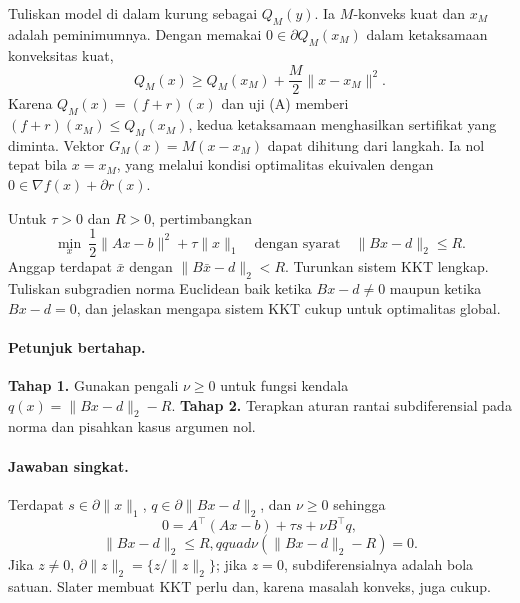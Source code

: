 Tuliskan model di dalam kurung sebagai $Q_M(y)$. Ia $M$-konveks kuat dan
$x_M$ adalah peminimumnya. Dengan memakai $0\in\partial Q_M(x_M)$ dalam
ketaksamaan konveksitas kuat,
\[
 Q_M(x)\ge Q_M(x_M)+\frac M2\lVert x-x_M\rVert^2.
\]
Karena $Q_M(x)=(f+r)(x)$ dan uji (A) memberi
$(f+r)(x_M)\le Q_M(x_M)$, kedua ketaksamaan menghasilkan sertifikat yang
diminta. Vektor $G_M(x)=M(x-x_M)$ dapat dihitung dari langkah. Ia nol tepat
bila $x=x_M$, yang melalui kondisi optimalitas ekuivalen dengan
$0\in\nabla f(x)+\partial r(x)$.

\begin{exercise}
\label{orig03:final:exercise:0003}
Untuk $\tau>0$ dan $R>0$, pertimbangkan
\[
 \min_x\ \frac12\lVert Ax-b\rVert^2+\tau\lVert x\rVert_1
 \quad\text{dengan syarat}\quad \lVert Bx-d\rVert_2\le R.
\]
Anggap terdapat $\bar x$ dengan $\lVert B\bar x-d\rVert_2<R$. Turunkan sistem
KKT lengkap. Tuliskan subgradien norma Euclidean baik ketika
$Bx-d\ne0$ maupun ketika $Bx-d=0$, dan jelaskan mengapa sistem KKT cukup untuk
optimalitas global.
\end{exercise}

\paragraph{Petunjuk bertahap.}
\label{orig03:final:hint:0003}
\textbf{Tahap 1.} Gunakan pengali $\nu\ge0$ untuk fungsi kendala
$q(x)=\lVert Bx-d\rVert_2-R$.
\textbf{Tahap 2.} Terapkan aturan rantai subdiferensial pada norma dan pisahkan
kasus argumen nol.

\paragraph{Jawaban singkat.}
\label{orig03:final:answer:0003}
Terdapat $s\in\partial\lVert x\rVert_1$, $q\in\partial\lVert Bx-d\rVert_2$,
dan $\nu\ge0$ sehingga
\[
 0=A^\top(Ax-b)+\tau s+\nu B^\top q,
\]
\[
 \lVert Bx-d\rVert_2\le R,qquad
 \nu(\lVert Bx-d\rVert_2-R)=0.
\]
Jika $z\ne0$, $\partial\lVert z\rVert_2=\{z/\lVert z\rVert_2\}$; jika
$z=0$, subdiferensialnya adalah bola satuan. Slater membuat KKT perlu dan,
karena masalah konveks, juga cukup.

